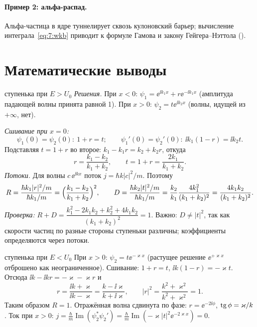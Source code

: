 \paragraph{Пример 2: альфа-распад.} Альфа-частица в ядре туннелирует сквозь кулоновский барьер;
вычисление интеграла~\eqref{eq:7:wkb} приводит к формуле Гамова и закону Гейгера--Нэттола ().

\section{Математические выводы}

\begin{derivation}[label=der:7:step]{ступенька при $E>U_0$}
\emph{Решения.} При $x<0$: $\psi_1=\ee^{\ii k_1x}+r\ee^{-\ii k_1x}$ (амплитуда падающей волны
принята равной 1). При $x>0$: $\psi_2=t\ee^{\ii k_2x}$ (волны, идущей из $+\infty$, нет).

\emph{Сшивание при $x=0$:}
\[
  \psi_1(0)=\psi_2(0):\ 1+r=t;\qquad \psi_1'(0)=\psi_2'(0):\ \ii k_1(1-r)=\ii k_2t .
\]
Подставляя $t=1+r$ во второе: $k_1-k_1r=k_2+k_2r$, откуда
\[
  r=\frac{k_1-k_2}{k_1+k_2},\qquad t=1+r=\frac{2k_1}{k_1+k_2}.
\]
\emph{Потоки.} Для волны $c\,\ee^{\ii kx}$ поток $j=\hbar k|c|^2/m$. Поэтому
\[
  R=\frac{\hbar k_1|r|^2/m}{\hbar k_1/m}=\Bigl(\frac{k_1-k_2}{k_1+k_2}\Bigr)^2,\qquad
  D=\frac{\hbar k_2|t|^2/m}{\hbar k_1/m}=\frac{k_2}{k_1}\frac{4k_1^2}{(k_1+k_2)^2}=\frac{4k_1k_2}{(k_1+k_2)^2}.
\]
\emph{Проверка:} $R+D=\dfrac{k_1^2-2k_1k_2+k_2^2+4k_1k_2}{(k_1+k_2)^2}=1$. Важно: $D\neq|t|^2$, так как
скорости частиц по разные стороны ступеньки различны; коэффициенты определяются через потоки.
\end{derivation}

\begin{derivation}[label=der:7:stepbelow]{ступенька при $E<U_0$}
При $x>0$: $\psi_2=t\ee^{-\varkappa x}$ (растущее решение $\ee^{+\varkappa x}$ отброшено как неограниченное).
Сшивание: $1+r=t$, $\ii k(1-r)=-\varkappa t$. Отсюда $\ii k-\ii kr=-\varkappa-\varkappa r$ и
\[
  r=\frac{\ii k+\varkappa}{\ii k-\varkappa}=\frac{k-\ii\varkappa}{k+\ii\varkappa},\qquad
  |r|^2=\frac{k^2+\varkappa^2}{k^2+\varkappa^2}=1 .
\]
Таким образом $R=1$. Отражённая волна сдвинута по фазе: $r=\ee^{-2\ii\phi}$, $\operatorname{tg}\phi=\varkappa/k$.
Ток при $x>0$: $j=\frac{\hbar}{m}\operatorname{Im}(\psi_2^*\psi_2')=\frac{\hbar}{m}\operatorname{Im}(-\varkappa|t|^2\ee^{-2\varkappa x})=0$.
\end{derivation}

